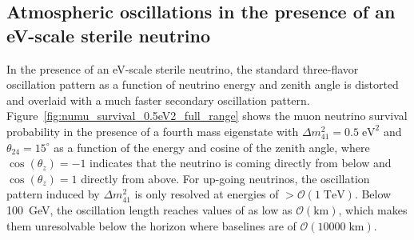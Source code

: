 \subsection{Atmospheric oscillations in the presence of an eV-scale sterile neutrino}
In the presence of an eV-scale sterile neutrino, the standard three-flavor oscillation pattern as a function of neutrino energy and zenith angle is distorted and overlaid with a much faster secondary oscillation pattern. Figure~\ref{fig:numu_survival_0.5eV2_full_range} shows the muon neutrino survival probability in the presence of a fourth mass eigenstate with $\Delta m^2_{41}=0.5\;\mathrm{eV^2}$ and $\theta_{24}=15^\circ$ as a function of the energy and cosine of the zenith angle, where $\cos(\theta_z)=-1$ indicates that the neutrino is coming directly from below and $\cos(\theta_z)=1$ directly from above. For up-going neutrinos, the oscillation pattern induced by $\Delta m^2_{41}$ is only resolved at energies of $>\mathcal{O}(1\;\mathrm{TeV})$. Below 100~GeV, the oscillation length reaches values of as low as $\mathcal{O}(\mathrm{km})$, which makes them unresolvable below the horizon where baselines are of $\mathcal{O}(10000\;\mathrm{km})$.

